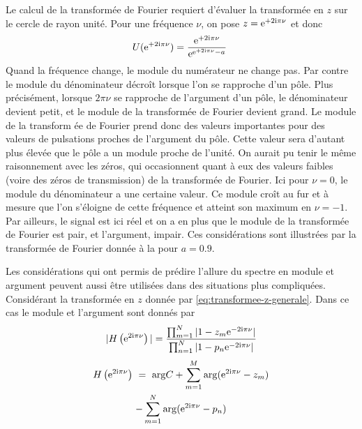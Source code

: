Le calcul de la transform\'{e}e de Fourier requiert d'\'{e}valuer la transform\'{e}e en $z$ sur le cercle de rayon unit\'{e}. Pour une fr\'{e}quence
$\nu$, on pose $z=\mathrm{e}^{+2 \mathrm{i} \pi \nu}$ et donc
$$
U(\mathrm{e}^{+2 \mathrm{i} \pi \nu})=\frac{\mathrm{e}^{+2 \mathrm{i} \pi \nu}}{\mathrm{e}^{\mathrm{e}^{+2 \mathrm{i} \pi \nu}-a}}\
$$
Quand la fr\'{e}quence change, le module du num\'{e}rateur ne change pas. Par contre le module du d\'{e}nominateur d\'{e}cro\^{i}t lorsque l'on se rapproche d'un p\^{o}le. Plus pr\'{e}cis\'{e}ment, lorsque $2\pi \nu$ se rapproche de l'argument d'un p\^{o}le, le d\'{e}nominateur devient petit, et le module de la transform\'{e}e de Fourier devient grand.  Le module de la transform \'{e}e de Fourier prend donc des valeurs importantes pour des valeurs de pulsations proches de l'argument du  p\^{o}le. Cette
valeur sera d'autant plus \'{e}lev\'{e}e que le p\^{o}le a un module proche de l'unit\'{e}. On aurait pu tenir le m\^{e}me raisonnement avec les z\'{e}ros, qui occasionnent quant \`{a} eux des valeurs faibles (voire des z\'{e}ros de transmission) de la transform\'{e}e de Fourier.
Ici pour $\nu=0$, le module du d\'{e}nominateur a une certaine valeur. Ce module cro\^{i}t au fur et \`{a} mesure que l'on s'\'{e}loigne de cette fr\'{e}quence et atteint son maximum en $\nu=-1$.  Par ailleurs, le signal est ici r\'{e}el et on a en plus que le module de la transform\'{e}e de Fourier est pair, et l'argument, impair. Ces consid\'{e}rations sont illustr\'{e}es par la transform\'{e}e de Fourier donn\'{e}e \`{a} la  pour $a=0.9$.

Les consid\'{e}rations qui ont permis de pr\'{e}dire l'allure du spectre en module et argument peuvent aussi \^{e}tre utilis\'{e}es dans des situations plus compliqu\'{e}es. Consid\'{e}rant la transform\'{e}e en $z$ donn\'{e}e par \eqref{eq:transformee-z-generale}. Dans ce cas le module et l'argument sont donn\'{e}s par
\begin{align*}
|H\left(\mathrm{e}^{2 \mathrm{i} \pi \nu}\right)|= \frac{\prod_{m=1}^N |1 -z_m \mathrm{e}^{-2 \mathrm{i} \pi \nu}|}{\prod_{n=1}^N |1 - p_n \mathrm{e}^{-2 \mathrm{i} \pi \nu}|} \\
\end{align*}
\begin{multline*}
H\left(\mathrm{e}^{2 \mathrm{i} \pi \nu}\right)\ =\ {\rm arg} C+\sum_{m=1}^{M}{\rm arg}(\mathrm{e}^{2 \mathrm{i} \pi \nu}-z_{m}) \\-
\sum_{m=1}^{N}{\rm arg}(\mathrm{e}^{2 \mathrm{i} \pi \nu}-p_{n})
\end{multline*}


